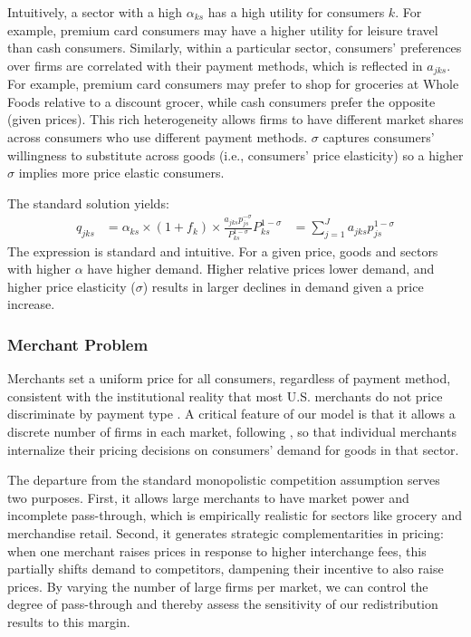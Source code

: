 \documentclass[main.tex]{subfiles}
\begin{document}
Intuitively, a sector with a high $\alpha_{ks}$ has a high utility for consumers $k$.
For example, premium card consumers may have a higher utility for leisure travel than cash consumers.
Similarly, within a particular sector, consumers' preferences over firms are correlated with their payment methods, which is reflected in $a_{jks}$.
For example, premium card consumers may prefer to shop for groceries at Whole Foods relative to a discount grocer, while cash consumers prefer the opposite (given prices).
This rich heterogeneity allows firms to have different market shares across consumers who use different payment methods.
$\sigma$ captures consumers' willingness to substitute across goods (i.e., consumers' price elasticity) so a higher $\sigma$ implies more price elastic consumers. 

The standard solution yields:
\begin{align}
q_{jks} & =\alpha_{ks}\times\left(1+f_{k}\right)\times\frac{a_{jks}p_{js}^{-\sigma}}{P_{ks}^{1-\sigma}} \label{eq:consumer-demand}
P_{ks}^{1-\sigma} & =\sum_{j=1}^{J}a_{jks}p_{js}^{1-\sigma}
\end{align}
The expression is standard and intuitive.
For a given price, goods and sectors with higher $\alpha$ have higher demand.
Higher relative prices lower demand, and higher price elasticity ($\sigma$) results in larger declines in demand given a price increase.

\subsubsection{Merchant Problem}

Merchants set a uniform price for all consumers, regardless of payment method, consistent with the institutional reality that most U.S. merchants do not price discriminate by payment type \citep{Stavins2018}.
A critical feature of our model is that it allows a discrete number of firms in each market, following \citet{Hottman.etal2016}, so that individual merchants internalize their pricing decisions on consumers' demand for goods in that sector.

The departure from the standard monopolistic competition assumption serves two purposes.
First, it allows large merchants to have market power and incomplete pass-through, which is empirically realistic for sectors like grocery and merchandise retail.
Second, it generates strategic complementarities in pricing: when one merchant raises prices in response to higher interchange fees, this partially shifts demand to competitors, dampening their incentive to also raise prices.
By varying the number of large firms per market, we can control the degree of pass-through and thereby assess the sensitivity of our redistribution results to this margin.
\end{document}
